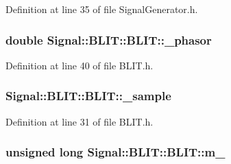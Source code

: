 Definition at line 35 of file Signal\+Generator.\+h.

\hypertarget{class_signal_1_1_b_l_i_t_1_1_b_l_i_t_ae1ed1e1125cef25e6a0dfb8de3c296da}{
\subsubsection[{\+\_\+phasor}]{\setlength{\rightskip}{0pt plus 5cm}double Signal\+::\+B\+L\+I\+T\+::\+B\+L\+I\+T\+::\+\_\+phasor\hspace{0.3cm}{\ttfamily [protected]}}}\label{class_signal_1_1_b_l_i_t_1_1_b_l_i_t_ae1ed1e1125cef25e6a0dfb8de3c296da}


Definition at line 40 of file B\+L\+I\+T.\+h.

\hypertarget{class_signal_1_1_b_l_i_t_1_1_b_l_i_t_ae3db6ee922897295fdf93a3b3c3dfadd}{
\subsubsection[{\+\_\+sample}]{ Signal\+::\+B\+L\+I\+T\+::\+B\+L\+I\+T\+::\+\_\+sample\hspace{0.3cm}{\ttfamily [protected]}}}\label{class_signal_1_1_b_l_i_t_1_1_b_l_i_t_ae3db6ee922897295fdf93a3b3c3dfadd}


Definition at line 31 of file B\+L\+I\+T.\+h.

\hypertarget{class_signal_1_1_b_l_i_t_1_1_b_l_i_t_a314aae37a0a53fa3f79a4466b9558fa5}{
\subsubsection[{m\+\_\+}]{\setlength{\rightskip}{0pt plus 5cm}unsigned long Signal\+::\+B\+L\+I\+T\+::\+B\+L\+I\+T\+::m\+\_\+\hspace{0.3cm}{\ttfamily [protected]}}}\label{class_signal_1_1_b_l_i_t_1_1_b_l_i_t_a314aae37a0a53fa3f79a4466b9558fa5}


